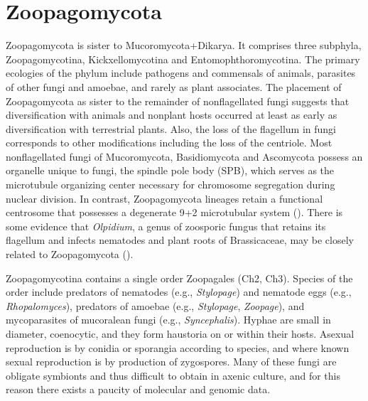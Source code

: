 \documentclass[]{book}
\begin{document}
\hypertarget{zoopagomycota}{%
\section{Zoopagomycota}\label{zoopagomycota}}

Zoopagomycota is sister to Mucoromycota+Dikarya. It comprises three subphyla, Zoopagomycotina, Kickxellomycotina and Entomophthoromycotina. The primary ecologies of the phylum include pathogens and commensals of animals, parasites of other fungi and amoebae, and rarely as plant associates. The placement of Zoopagomycota as sister to the remainder of nonflagellated fungi suggests that diversification with animals and nonplant hosts occurred at least as early as diversification with terrestrial plants. Also, the loss of the flagellum in fungi corresponds to other modifications including the loss of the centriole. Most nonflagellated fungi of Mucoromycota, Basidiomycota and Ascomycota possess an organelle unique to fungi, the spindle pole body (SPB), which serves as the microtubule organizing center necessary for chromosome segregation during nuclear division. In contrast, Zoopagomycota lineages retain a functional centrosome that possesses a degenerate 9+2 microtubular system (\citet{McLaughlin_2015}). There is some evidence that \emph{Olpidium}, a genus of zoosporic fungus that retains its flagellum and infects nematodes and plant roots of Brassicaceae, may be closely related to Zoopagomycota (\citet{Sekimoto_2011}).

Zoopagomycotina contains a single order Zoopagales (Ch2, Ch3). Species of the order include predators of nematodes (e.g., \emph{Stylopage}) and nematode eggs (e.g., \emph{Rhopalomyces}), predators of amoebae (e.g., \emph{Stylopage}, \emph{Zoopage}), and mycoparasites of mucoralean fungi (e.g., \emph{Syncephalis}). Hyphae are small in diameter, coenocytic, and they form haustoria on or within their hosts. Asexual reproduction is by conidia or sporangia according to species, and where known sexual reproduction is by production of zygospores. Many of these fungi are obligate symbionts and thus difficult to obtain in axenic culture, and for this reason there exists a paucity of molecular and genomic data.
\end{document}
